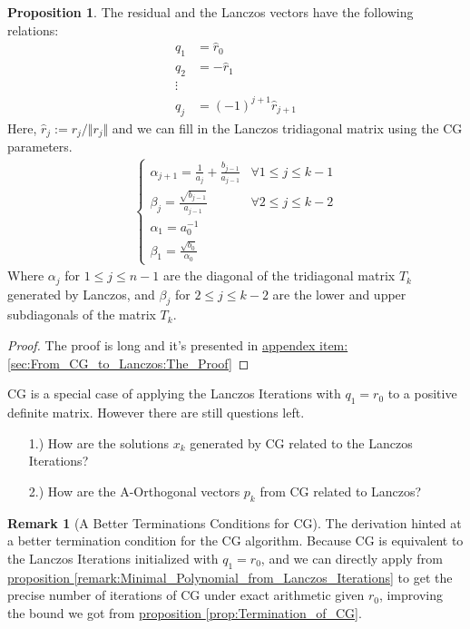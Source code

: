 \documentclass[]{article}
\theoremstyle{definition}
\newtheorem{prop}{Proposition}[section]  %
\newtheorem{remark}{Remark}[subsection]  %
\begin{document}
        \begin{prop}
            The residual and the Lanczos vectors have the following relations: 
            \begin{align}
                q_1 &= \hat r_0\\
                q_2 &= -\hat r_1
                \\
                \vdots
                \\
                q_j &= (-1)^{j + 1}\hat r_{j + 1}
            \end{align}
            Here, $\hat{r}_j:= r_j/\Vert r_j\Vert$ and we can fill in the Lanczos tridiagonal matrix using the CG parameters. 
            \begin{align}
                \begin{cases}
                    \alpha_{j + 1} = \frac{1}{a_j} + \frac{b_{j - 1}}{a_{j - 1}}
                    & \forall 1 \le j \le k - 1
                    \\
                    \beta_{j} = \frac{\sqrt{b_{j - 1}}}{a_{j - 1}}
                    & \forall 2 \le j \le k - 2 
                    \\
                    \alpha_1 = a_0^{-1} & 
                    \\
                    \beta_1 = \frac{\sqrt{b_0}}{\alpha_0}
                \end{cases}
            \end{align}
            Where $\alpha_j$ for $1\le j \le n - 1$ are the diagonal of the tridiagonal matrix $T_k$ generated by Lanczos, and $\beta_j$ for $2\le j \le k - 2$ are the lower and upper subdiagonals of the matrix $T_k$. 
        \end{prop}
        \begin{proof}
            The proof is long and it's presented in \hyperref[sec:From_CG_to_Lanczos:The_Proof]{appendex item: \ref*{sec:From_CG_to_Lanczos:The_Proof}}
        \end{proof}
        CG is a special case of applying the Lanczos Iterations with $q_1 = r_0$ to a positive definite matrix. However there are still questions left. 
            \begin{enumerate}
                \item [1.)] How are the solutions $x_k$ generated by CG related to the Lanczos Iterations? 
                \item [2.)] How are the A-Orthogonal vectors $p_k$ from CG related to Lanczos?
            \end{enumerate}
        \begin{remark}[A Better Terminations Conditions for CG]
                The derivation hinted at a better termination condition for the CG algorithm. Because CG is equivalent to the Lanczos Iterations initialized with $q_1 = r_0$, and we can directly apply from \hyperref[remark:Minimal_Polynomial_from_Lanczos_Iterations]{proposition \ref*{remark:Minimal_Polynomial_from_Lanczos_Iterations}} to get the precise number of iterations of CG under exact arithmetic given $r_0$, improving the bound we got from \hyperref[prop:Termination_of_CG]{proposition \ref*{prop:Termination_of_CG}}.
            \end{remark}
\end{document}
